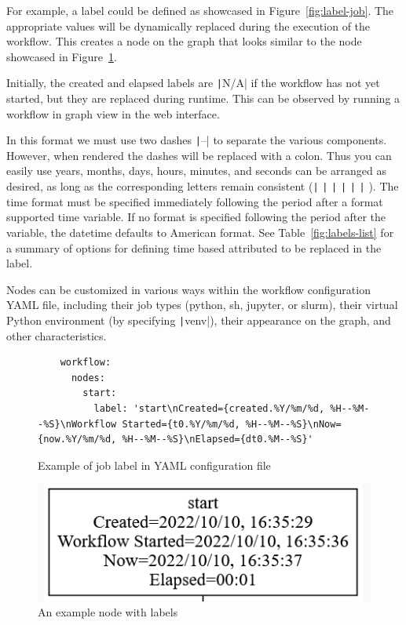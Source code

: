 For example, a label could be defined as showcased in
Figure~\ref{fig:label-job}. The appropriate values will be dynamically
replaced during the execution of the workflow.
This creates a node on the graph that looks similar to the node
showcased in Figure~\ref{fig:label-node}.

Initially, the created and elapsed labels are \texttt|N/A| if the
workflow has not yet started, but they are replaced during runtime. This
can be observed by running a workflow in graph view in the web
interface.

In this format we must use two dashes \texttt|--| to separate the various components.
However, when rendered the dashes will be replaced with a colon.
Thus you can easily use years, months, days,
hours, minutes, and seconds can be arranged as desired, as long as the
corresponding letters remain consistent 
(\texttt|%
\texttt|%
\texttt|%
\texttt|%
\texttt|%
\texttt|%
).
The time format must be specified immediately following the period after a format supported time variable.
If no format is specified following the period after the variable, the
datetime defaults to American format.
See Table~\ref{fig:labels-list} for a summary of options for defining time
based attributed to be replaced in the label.


Nodes can be customized in various ways within the workflow
configuration YAML file, including their job types (python, sh, jupyter,
or slurm), their virtual Python environment (by specifying
\texttt|venv|), their appearance on the graph, and other
characteristics.


\begin{figure}
\smallskip
    \begin{verbatim}
    workflow:
      nodes:
        start:
          label: 'start\nCreated={created.%Y/%m/%d, %H--%M--%S}\nWorkflow Started={t0.%Y/%m/%d, %H--%M--%S}\nNow={now.%Y/%m/%d, %H--%M--%S}\nElapsed={dt0.%M--%S}'
    \end{verbatim}
    \caption{Example of job label in YAML configuration file}
    \label{fig:label-job}

\centering
\includegraphics[width=0.7\columnwidth]{images/labelmaker-example.png}
\caption{An example node with labels}\label{fig:label-node}
\end{figure}


